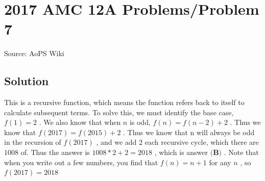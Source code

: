 \documentclass[12pt]{article}
\begin{document}
\section*{{2017 AMC 12A Problems/Problem 7}}
Source: AoPS Wiki

\subsection*{Solution}
This is a recursive function, which means the function refers back to itself to calculate subsequent terms. To solve this, we must identify the base case, $f(1)=2$ . We also know that when $n$ is odd, $f(n)=f(n-2)+2$ . Thus we know that $f(2017)=f(2015)+2$ . Thus we know that n will always be odd in the recursion of $f(2017)$ , and we add $2$ each recursive cycle, which there are $1008$ of. Thus the answer is $1008*2+2=2018$ , which is answer $\boxed{\textbf{(B)}}$ .
Note that when you write out a few numbers, you find that $f(n)=n+1$ for any $n$ , so $f(2017)=2018$
\end{document}
